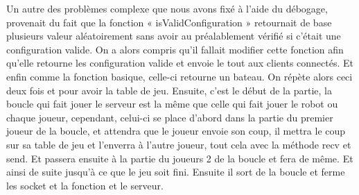 \documentclass{article}
\begin{document}
	\newline Un autre des probl\`emes complexe que nous avons fix\'e \`a l'aide du débogage, provenait du fait que la fonction « isValidConfiguration » retournait de base plusieurs valeur aléatoirement sans avoir au préalablement vérifié si c'\'etait une configuration valide. On a alors compris qu’il fallait modifier cette fonction afin qu'elle retourne les configuration valide et envoie le tout aux clients connect\'es.
	\newline Et enfin comme la fonction basique, celle-ci retourne un bateau. On r\'ep\`ete alors ceci deux fois et pour avoir la table de jeu.
	Ensuite, c’est le d\'ebut de la partie, la boucle qui fait jouer le serveur est la même que celle qui fait jouer le robot ou chaque joueur, cependant, celui-ci se place d’abord dans la partie du premier joueur de la boucle, et attendra que le joueur envoie son coup, il mettra le coup sur sa table de jeu et  l’enverra à l’autre joueur, tout cela avec la méthode recv et send. Et passera ensuite à la partie du joueurs 2 de la boucle et fera de même. Et ainsi de suite jusqu’à ce que le jeu soit fini. Ensuite il sort de la boucle et ferme les socket et la fonction et le serveur.
\end{document}
